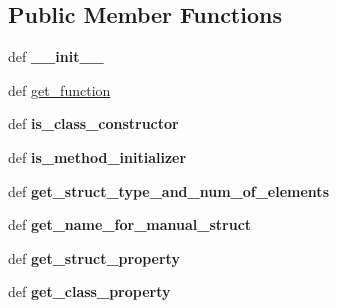 \subsection*{Public Member Functions}
\begin{DoxyCompactItemize}
\item 
\hypertarget{classgenerate__js__bindings_1_1_j_s_b_generate_a4fbb58686744676571d388277363271e}{def {\bfseries \-\_\-\-\_\-init\-\_\-\-\_\-}}\label{classgenerate__js__bindings_1_1_j_s_b_generate_a4fbb58686744676571d388277363271e}

\item 
def \hyperlink{classgenerate__js__bindings_1_1_j_s_b_generate_a94fb094b20cd96e2149eedfa07da4f11}{get\-\_\-function}
\item 
\hypertarget{classgenerate__js__bindings_1_1_j_s_b_generate_abb486d0e1b4aa0c036f88279cd05f7f2}{def {\bfseries is\-\_\-class\-\_\-constructor}}\label{classgenerate__js__bindings_1_1_j_s_b_generate_abb486d0e1b4aa0c036f88279cd05f7f2}

\item 
\hypertarget{classgenerate__js__bindings_1_1_j_s_b_generate_af249768e3230a8bf9345780d17d3c629}{def {\bfseries is\-\_\-method\-\_\-initializer}}\label{classgenerate__js__bindings_1_1_j_s_b_generate_af249768e3230a8bf9345780d17d3c629}

\item 
\hypertarget{classgenerate__js__bindings_1_1_j_s_b_generate_a8ebe5a1b67d122759aa8396821aafab9}{def {\bfseries get\-\_\-struct\-\_\-type\-\_\-and\-\_\-num\-\_\-of\-\_\-elements}}\label{classgenerate__js__bindings_1_1_j_s_b_generate_a8ebe5a1b67d122759aa8396821aafab9}

\item 
\hypertarget{classgenerate__js__bindings_1_1_j_s_b_generate_a6751caa2c5b4f747231bf7749a1fbaa0}{def {\bfseries get\-\_\-name\-\_\-for\-\_\-manual\-\_\-struct}}\label{classgenerate__js__bindings_1_1_j_s_b_generate_a6751caa2c5b4f747231bf7749a1fbaa0}

\item 
\hypertarget{classgenerate__js__bindings_1_1_j_s_b_generate_a30d59d8eaf9ed6ddbbd3f4ca0f3be6db}{def {\bfseries get\-\_\-struct\-\_\-property}}\label{classgenerate__js__bindings_1_1_j_s_b_generate_a30d59d8eaf9ed6ddbbd3f4ca0f3be6db}

\item 
\hypertarget{classgenerate__js__bindings_1_1_j_s_b_generate_a7afd22cfa61ebc45dda03c6f2014ba76}{def {\bfseries get\-\_\-class\-\_\-property}}\label{classgenerate__js__bindings_1_1_j_s_b_generate_a7afd22cfa61ebc45dda03c6f2014ba76}


\end{DoxyCompactItemize}
